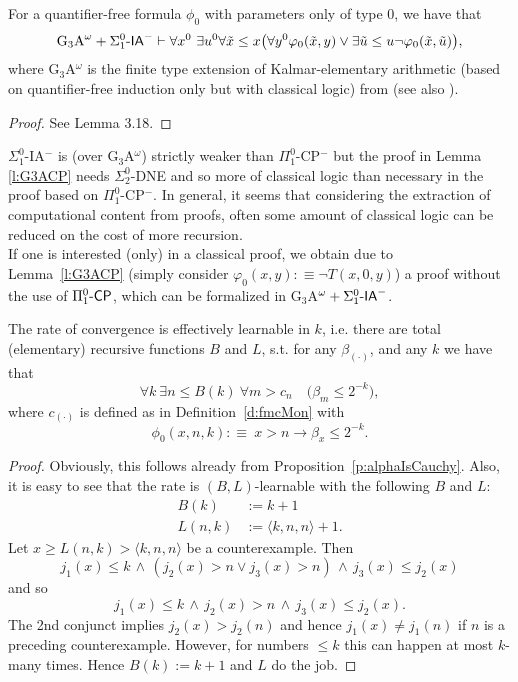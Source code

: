 \begin{lemma}\label{l:G3ACP} 
For a quantifier-free formula $\phi_0$ with parameters only of type $0$, we have that
\[
\mbox{\rm G$_3$A}^\omega + 
\Sigma^0_1\textsf{\upshape -}\textsf{\upshape IA}^- \vdash 
\forall x^0\ \exists u^0 
\forall\tilde x\leq x \big(  
\forall y^0 \varphi_0(\tilde x,y)
\vee\exists\tilde u\leq u\neg\varphi_0(\tilde x,\tilde u) \big),
\]
where {\rm G$_3$A$^{\omega}$} is the finite type extension of Kalmar-elementary 
arithmetic (based on quantifier-free induction only but with classical logic) 
from 
{\rm \cite{Kohlenbach(lowrate)}} (see also {\rm \cite{Kohlenbach08}}).
\end{lemma}
\begin{proof}
See \cite{Kohlenbach08} Lemma 3.18.
\end{proof}

\begin{rmk}
$\Sigma^0_1$-IA$^-$ is (over G$_3$A$^{\omega}$) strictly weaker than 
$\Pi^0_1$-CP$^-$ but the proof in Lemma \ref{l:G3ACP} needs $\Sigma^0_2$-DNE 
and so more of classical logic than necessary in the proof based on 
$\Pi^0_1$-CP$^-$.
In general, it seems that considering the extraction of computational content 
from proofs, often some amount of classical logic can be reduced on the cost of more recursion.\\
If one is interested (only) in a classical proof, we obtain due to Lemma~\ref{l:G3ACP}
(simply consider $\varphi_0(x,y):\equiv \neg T(x,0,y)$) a proof without the use of $\Pi^0_1\textsf{\upshape -}\textsf{\upshape CP}$, which can be formalized in G$_3$A$^{\omega}+\Sigma^0_1\textsf{\upshape -}\textsf{\upshape IA}^-$.
\end{rmk}


\begin{prop}\label{p:alphaIsLearnable}
The rate of convergence is effectively learnable in $k$, i.e.
there are total (elementary) 
recursive functions $B$ and $L$, s.t. for any $\beta_{(\cdot)}$, and any $k$ we have that
\[ \forall k\ \exists n\leq B(k)\ \forall m > c_n\quad \big(\beta_m\leq 2^{-k}\big),\]
where $c_{(\cdot)}$ is defined as in Definition~\ref{d:fmcMon} with
\[
\phi_0(x,n,k):\equiv\ x> n\rightarrow \beta_x\le 2^{-k}.
\]
\end{prop}
\begin{proof}
Obviously, this follows already from Proposition~\ref{p:alphaIsCauchy}. Also, it is easy to see that the 
rate is $(B,L)$-learnable with the following $B$ and $L$:
\begin{align*}
B(k)&:=k+1  \\
L(n,k)&:= \langle k,n,n \rangle+1.
\end{align*}
Let $x\ge L(n,k)>\langle k,n,n\rangle$ be a counterexample. Then 
\[ j_1(x)\le k\,\wedge\,(j_2(x)>n\vee j_3(x)>n)\,\wedge \,j_3(x)\le j_2(x) \] 
and so 
\[ j_1(x)\le k\,\wedge\,j_2(x)>n\,\wedge\,j_3(x)\le j_2(x). \]
The 2nd conjunct implies $j_2(x)>j_2(n)$ and hence $j_1(x)\not= j_1(n)$ 
if $n$ is a preceding counterexample. However, for numbers $\le k$ this can 
happen at most $k$-many times. Hence $B(k):=k+1$ and $L$ do the job.
\end{proof}


